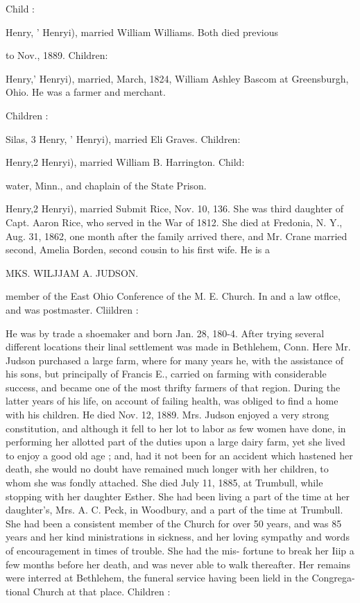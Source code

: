 \documentclass[oneside]{book}
\begin{document}
Child : 


Henry, ' Henryi), married William Williams. Both died previous 

to Nov., 1889. Children: 



Henry,' Henryi), married, March, 1824, William Ashley Bascom 
at Greensburgh, Ohio. He was a farmer and merchant. 

Children : 





Silas, 3 Henry, ' Henryi), married Eli Graves. Children: 










Henry,2 Henryi), married William B. Harrington. Child: 

water, Minn., and chaplain of the State Prison. 

Henry,2 Henryi), married Submit Rice, Nov. 10, 136. She 
was third daughter of Capt. Aaron Rice, who served in the War 
of 1812. She died at Fredonia, N. Y., Aug. 31, 1862, one 
month after the family arrived there, and Mr. Crane married 
second, Amelia Borden, second cousin to his first wife. He is a 




MKS. WILJJAM A. JUDSON. 




member of the East Ohio Conference of the M. E. Church. In 
and a law otflce, and was postmaster. Cliildren : 




He was by trade a shoemaker and born Jan. 28, 180-4. After 
trying several different locations their linal settlement was made 
in Bethlehem, Conn. Here Mr. Judson purchased a large farm, 
where for many years he, with the assistance of his sons, but 
principally of Francis E., carried on farming with considerable 
success, and became one of the most thrifty farmers of that 
region. During the latter years of his life, on account of failing 
health, was obliged to find a home with his children. He died 
Nov. 12, 1889. Mrs. Judson enjoyed a very strong constitution, 
and although it fell to her lot to labor as few women have done, 
in performing her allotted part of the duties upon a large dairy 
farm, yet she lived to enjoy a good old age ; and, had it not been 
for an accident which hastened her death, she would no doubt 
have remained much longer with her children, to whom she was 
fondly attached. She died July 11, 1885, at Trumbull, while 
stopping with her daughter Esther. She had been living a part 
of the time at her daughter's, Mrs. A. C. Peck, in Woodbury, 
and a part of the time at Trumbull. She had been a consistent 
member of the Church for over 50 years, and was 85 years and 
her kind ministrations in sickness, and her loving sympathy and 
words of encouragement in times of trouble. She had the mis- 
fortune to break her Iiip a few months before her death, and was 
never able to walk thereafter. Her remains were interred at 
Bethlehem, the funeral service having been lield in the Congrega- 
tional Church at that place. Children : 
\end{document}
